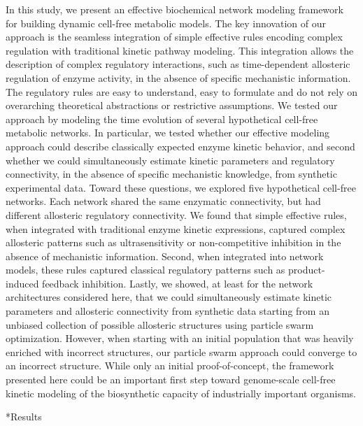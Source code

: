 \documentclass[12pt]{article}
\makeatletter
\renewcommand\section{\@startsection
	{subsection}{2}{0mm}
	{-0.2in}
	{0.05\baselineskip}
	{\normalfont\large\bfseries}}
\makeatother
\begin{document}
In this study, we present an effective biochemical network modeling framework for building dynamic cell-free metabolic models.
The key innovation of our approach is the seamless integration of simple effective rules encoding complex regulation with traditional kinetic pathway modeling. 
This integration allows the description of complex regulatory interactions, such as time-dependent allosteric regulation of enzyme activity, in the absence of specific mechanistic information. 
The regulatory rules are easy to understand, easy to formulate and do not rely on overarching theoretical abstractions or restrictive assumptions. 
We tested our approach by modeling the time evolution of several hypothetical cell-free metabolic networks. 
In particular, we tested whether our effective modeling approach could describe classically expected enzyme kinetic behavior, and second whether we could simultaneously estimate kinetic parameters and regulatory connectivity, in the absence of specific mechanistic knowledge, from synthetic experimental data. 
Toward these questions, we explored five hypothetical cell-free networks. 
Each network shared the same enzymatic connectivity, but had different allosteric regulatory connectivity. 
We found that simple effective rules, when integrated with traditional enzyme kinetic expressions, captured complex allosteric patterns such as ultrasensitivity or non-competitive inhibition in the absence of mechanistic information. Second, when integrated into network models, these rules captured classical regulatory patterns such as product-induced feedback inhibition. 
Lastly, we showed, at least for the network architectures considered here, that we could simultaneously estimate kinetic parameters and allosteric connectivity from synthetic data 
starting from an unbiased collection of possible allosteric structures using particle swarm optimization. However, when starting with an initial population that was heavily enriched with incorrect structures, our particle swarm approach could converge to an incorrect structure.
While only an initial proof-of-concept, the framework presented here could be an important first step toward genome-scale cell-free kinetic modeling of the biosynthetic capacity of industrially important organisms.

\clearpage

\section*{Results}
\end{document}
